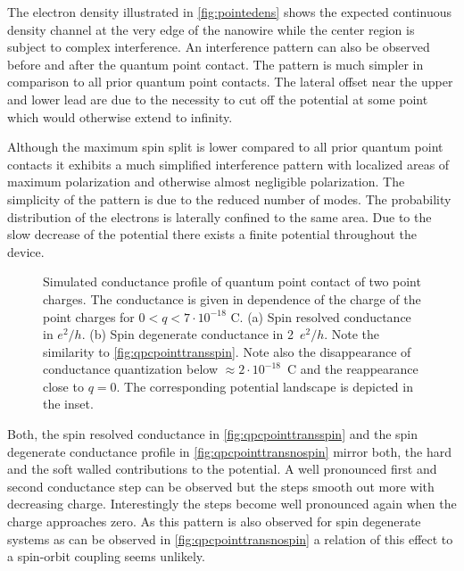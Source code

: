 The electron density illustrated in \cref{fig:pointedens} shows the expected continuous density channel at the very edge of the nanowire while the center region is subject to complex interference. An interference pattern can also be observed before and after the quantum point contact. The pattern is much simpler in comparison to all prior quantum point contacts. The lateral offset near the upper and lower lead are due to the necessity to cut off the potential at some point which would otherwise extend to infinity.\par
Although the maximum spin split is lower compared to all prior quantum point contacts it exhibits a much simplified interference pattern with localized areas of maximum polarization and otherwise almost negligible polarization. The simplicity of the pattern is due to the reduced number of modes. The probability distribution of the electrons is laterally confined to the same area. Due to the slow decrease of the potential there exists a finite potential throughout the device.\par
\begin{figure}[h]
  \centering
  \caption{Simulated conductance profile of quantum point contact of two point charges. The conductance is given in dependence of the charge of the point charges for $0 < q <7\cdot 10^{-18}$ C. (a) Spin resolved conductance in $e^2/h$. (b) Spin degenerate conductance in 2~$e^2/h$. Note the similarity to \cref{fig:qpcpointtransspin}. Note also the disappearance of conductance quantization below $\approx 2\cdot10^{-18}$~C and the reappearance close to $q=0$. The corresponding potential landscape is depicted in the inset.}
\end{figure}
Both, the spin resolved conductance in \cref{fig:qpcpointtransspin} and the spin degenerate conductance profile in \cref{fig:qpcpointtransnospin} mirror both, the hard and the soft walled contributions to the potential. A well pronounced first and second conductance step can be observed but the steps smooth out more with decreasing charge. Interestingly the steps become well pronounced again when the charge approaches zero. As this pattern is also observed for spin degenerate systems as can be observed in \cref{fig:qpcpointtransnospin} a relation of this effect to a spin-orbit coupling seems unlikely. 
